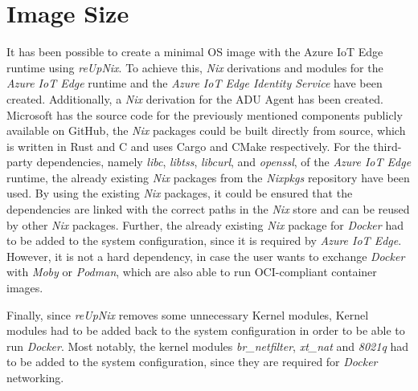 
\section{Image Size}
It has been possible to create a minimal \ac{OS} image with the Azure IoT Edge runtime
using \textit{reUpNix}. To achieve this, \textit{Nix} derivations and modules for
the \textit{Azure IoT Edge} runtime and the \textit{Azure IoT Edge Identity Service}
have been created. Additionally, a \textit{Nix} derivation for the \ac{ADU} Agent has been created.
Microsoft has the source code for the previously mentioned components
publicly available on GitHub, the \textit{Nix} packages could be built directly
from source, which is written in Rust and C and uses Cargo and CMake respectively.
For the third-party dependencies, namely \textit{libc}, \textit{libtss}, \textit{libcurl}, and
\textit{openssl}, of the \textit{Azure IoT Edge} runtime, the already existing \textit{Nix} packages
from the \textit{Nixpkgs} repository have been used.
By using the existing \textit{Nix} packages, it could be ensured that the dependencies
are linked with the correct paths in the \textit{Nix} store and can be reused
by other \textit{Nix} packages.
Further, the already existing \textit{Nix} package for \textit{Docker} had to be added
to the system configuration, since it is required by \textit{Azure IoT Edge}.
However, it is not a hard dependency, in case the user wants to exchange \textit{Docker}
with \textit{Moby} or \textit{Podman}, which are also able to run \ac{OCI}-compliant
container images.

Finally, since \textit{reUpNix} removes some unnecessary
Kernel modules, Kernel modules had to be added back to the system configuration in order
to be able to run \textit{Docker}.
Most notably, the kernel modules
\textit{br\_netfilter}, \textit{xt\_nat} and \textit{8021q} had to be added to the system configuration,
since they are required for \textit{Docker} networking.

